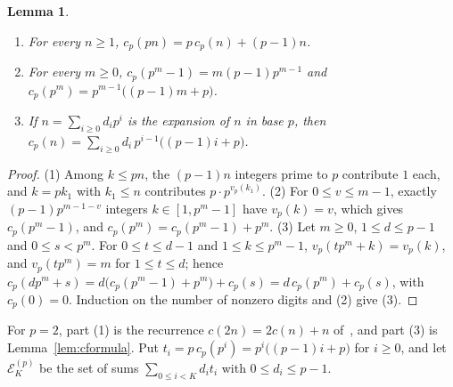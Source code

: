 \documentclass[11pt]{amsart}
\newtheorem{Lemma}[Theorem]{Lemma}
\theoremstyle{definition}
\begin{document}
\begin{Lemma}
\label{lem:cp}
\begin{enumerate}
\item For every $n\ge1$, $c_p(pn)=p\,c_p(n)+(p-1)n$.
\item For every $m\ge0$, $c_p(p^m-1)=m(p-1)p^{m-1}$ and $c_p(p^m)=p^{m-1}\bigl((p-1)m+p\bigr)$.
\item If $n=\sum_{i\ge0}d_ip^i$ is the expansion of $n$ in base $p$, then $c_p(n)=\sum_{i\ge0}d_i\,p^{i-1}\bigl((p-1)i+p\bigr)$.
\end{enumerate}
\end{Lemma}
\begin{proof}
(1) Among $k\le pn$, the $(p-1)n$ integers prime to $p$ contribute $1$ each, and $k=pk_1$ with $k_1\le n$ contributes $p\cdot p^{v_p(k_1)}$. (2) For $0\le v\le m-1$, exactly $(p-1)p^{m-1-v}$ integers $k\in[1,p^m-1]$ have $v_p(k)=v$, which gives $c_p(p^m-1)$, and $c_p(p^m)=c_p(p^m-1)+p^m$. (3) Let $m\ge0$, $1\le d\le p-1$ and $0\le s<p^m$. For $0\le t\le d-1$ and $1\le k\le p^m-1$, $v_p(tp^m+k)=v_p(k)$, and $v_p(tp^m)=m$ for $1\le t\le d$; hence $c_p(dp^m+s)=d\bigl(c_p(p^m-1)+p^m\bigr)+c_p(s)=d\,c_p(p^m)+c_p(s)$, with $c_p(0)=0$. Induction on the number of nonzero digits and (2) give (3).
\end{proof}

For $p=2$, part (1) is the recurrence $c(2n)=2c(n)+n$ of~\cite{nicolas2005open}, and part (3) is Lemma~\ref{lem:cformula}. Put $t_i=p\,c_p(p^i)=p^i\bigl((p-1)i+p\bigr)$ for $i\ge0$, and let $\mathcal{E}^{(p)}_K$ be the set of sums $\sum_{0\le i<K}d_it_i$ with $0\le d_i\le p-1$.
\end{document}
